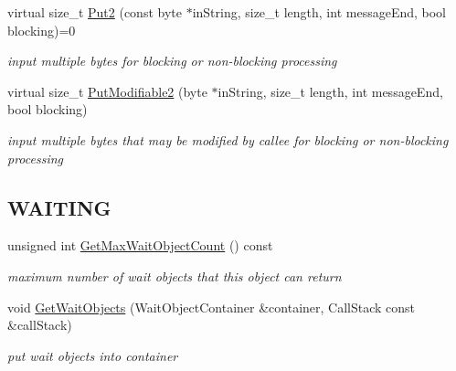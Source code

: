 \begin{DoxyCompactItemize}
\item 
virtual size\_\-t \hyperlink{class_buffered_transformation_ad396dcb42260f23125a35ec0e5d17d55}{Put2} (const byte $\ast$inString, size\_\-t length, int messageEnd, bool blocking)=0
\begin{DoxyCompactList}\small\item\em input multiple bytes for blocking or non-\/blocking processing \item\end{DoxyCompactList}\item 
virtual size\_\-t \hyperlink{class_buffered_transformation_a770bf11f26d4dec66423a7dc2d36843d}{PutModifiable2} (byte $\ast$inString, size\_\-t length, int messageEnd, bool blocking)
\begin{DoxyCompactList}\small\item\em input multiple bytes that may be modified by callee for blocking or non-\/blocking processing \item\end{DoxyCompactList}\end{DoxyCompactItemize}
\subsection*{WAITING}
\label{_amgrp1869d56535e8b1449a6da54ff5e11f50}
 \begin{DoxyCompactItemize}
\item 
\hypertarget{class_buffered_transformation_a99cd939cda477af4d8e09bf15c692dc2}{
unsigned int \hyperlink{class_buffered_transformation_a99cd939cda477af4d8e09bf15c692dc2}{GetMaxWaitObjectCount} () const }
\label{class_buffered_transformation_a99cd939cda477af4d8e09bf15c692dc2}

\begin{DoxyCompactList}\small\item\em maximum number of wait objects that this object can return \item\end{DoxyCompactList}\item 
void \hyperlink{class_buffered_transformation_a127ccd1793fdda6548cd1295f848d0f7}{GetWaitObjects} (WaitObjectContainer \&container, CallStack const \&callStack)
\begin{DoxyCompactList}\small\item\em put wait objects into container \item\end{DoxyCompactList}\end{DoxyCompactItemize}
